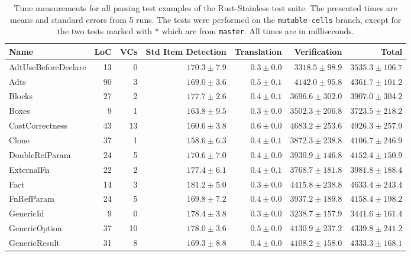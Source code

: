 \begin{table}
\centering
\caption{Time measurements for all passing test examples of the Rust-Stainless test suite. The presented times are means and standard errors from 5 runs. The tests were performed on the \texttt{mutable-cells} branch, except for the two tests marked with * which are from \texttt{master}. All times are in milliseconds.}
\label{measurements}
\begin{tabular}{lrrrrrr}
\toprule
Name &  LoC &  VCs & Std Item Detection &  Translation &       Verification &              Total \\
\midrule
AdtUseBeforeDeclare      &   13 &    0 &      $170.3\pm7.9$ &  $0.3\pm0.0$ &    $3318.5\pm98.9$ &   $3535.3\pm106.7$ \\
Adts                     &   90 &    3 &      $169.0\pm3.6$ &  $0.5\pm0.1$ &    $4142.0\pm95.8$ &   $4361.7\pm101.2$ \\
Blocks                   &   27 &    2 &      $177.7\pm2.6$ &  $0.4\pm0.1$ &   $3696.6\pm302.0$ &   $3907.0\pm304.2$ \\
Boxes                    &    9 &    1 &      $163.8\pm9.5$ &  $0.3\pm0.0$ &   $3502.3\pm206.8$ &   $3723.5\pm218.2$ \\
CastCorrectness          &   43 &   13 &      $160.6\pm3.8$ &  $0.6\pm0.0$ &   $4683.2\pm253.6$ &   $4926.3\pm257.9$ \\
Clone                    &   37 &    1 &      $158.6\pm6.3$ &  $0.4\pm0.1$ &   $3872.3\pm238.8$ &   $4106.7\pm246.9$ \\
DoubleRefParam           &   24 &    5 &      $170.6\pm7.0$ &  $0.4\pm0.0$ &   $3930.9\pm146.8$ &   $4152.4\pm150.9$ \\
ExternalFn               &   22 &    2 &      $177.4\pm6.1$ &  $0.4\pm0.1$ &   $3768.7\pm181.8$ &   $3981.8\pm188.4$ \\
Fact                     &   14 &    3 &      $181.2\pm5.0$ &  $0.3\pm0.0$ &   $4415.8\pm238.8$ &   $4633.4\pm243.4$ \\
FnRefParam               &   24 &    5 &      $169.8\pm7.2$ &  $0.4\pm0.0$ &   $3937.2\pm189.8$ &   $4158.4\pm198.2$ \\
GenericId                &    9 &    0 &      $178.4\pm3.8$ &  $0.3\pm0.0$ &   $3238.7\pm157.9$ &   $3441.6\pm161.4$ \\
GenericOption            &   37 &   10 &      $178.0\pm3.6$ &  $0.5\pm0.0$ &   $4130.9\pm237.2$ &   $4339.8\pm241.2$ \\
GenericResult            &   31 &    8 &      $169.3\pm8.8$ &  $0.4\pm0.0$ &   $4108.2\pm158.0$ &   $4333.3\pm168.1$ \\

\end{tabular}
\end{table}
